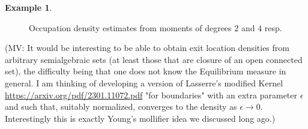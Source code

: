 \documentclass[12pt]{amsart}
\theoremstyle{definition}
\newtheorem{examplex}[lemma]{Example}
\newcommand\mv[1]{{\color{blue}(MV: #1)}}
\begin{document}
\begin{examplex}
\begin{figure}
    \centering
    \caption{Occupation density estimates from moments of degrees $2$ and $4$ resp.}
    \label{fig: Bessel_Occup_densities}
\end{figure}
\end{examplex}

\mv{It would be interesting to be able to obtain exit location densities from arbitrary semialgebraic sets (at least those that are closure of an open connected set), the difficulty being that one does not know the Equilibrium measure in general. I am thinking of developing a version of Lasserre's modified Kernel \url{https://arxiv.org/pdf/2301.11072.pdf}  "for boundaries" with an extra parameter $\epsilon$ and such that, suitably normalized, converges to the density as $\epsilon\rightarrow 0$. Interestingly this is exactly Young's mollifier idea we discussed long ago.}
\end{document}
